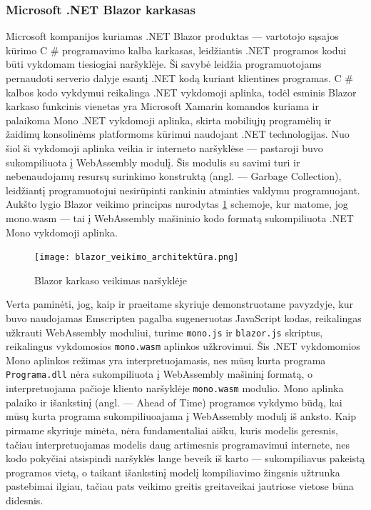 \documentclass{VUMIFPSkursinis}
\begin{document}
\subsubsection{Microsoft .NET Blazor karkasas}
Microsoft kompanijos kuriamas .NET Blazor produktas — vartotojo sąsajos kūrimo C \# programavimo kalba karkasas, leidžiantis .NET programos kodui būti vykdomam tiesiogiai naršyklėje. \cite{BLZ19} Ši savybė leidžia programuotojams pernaudoti serverio dalyje esantį .NET kodą kuriant klientines programas.
C \# kalbos kodo vykdymui reikalinga .NET vykdomoji aplinka, todėl esminis Blazor karkaso funkcinis vienetas yra Microsoft Xamarin komandos kuriama ir palaikoma Mono .NET vykdomoji aplinka, skirta mobiliųjų programėlių ir žaidimų konsolinėms platformoms kūrimui naudojant .NET technologijas. Nuo šiol ši vykdomoji aplinka veikia ir interneto naršyklėse — pastaroji buvo sukompiliuota į WebAssembly modulį. Šis modulis su savimi turi ir nebenaudojamų resursų surinkimo konstruktą (angl. — Garbage Collection), leidžiantį programuotojui nesirūpinti rankiniu atminties valdymu programuojant. Aukšto lygio Blazor veikimo principas nurodytas \ref{fig:blazor_architecture} schemoje, kur matome, jog mono.wasm — tai į WebAssembly mašininio kodo formatą sukompiliuota .NET Mono vykdomoji aplinka.

\begin{figure}[h!]
  \begin{center}
  \texttt{[image: blazor\_veikimo\_architektūra.png]}
  \end{center}
  \caption{Blazor karkaso veikimas naršyklėje \cite{BLZ19}}
  \label{fig:blazor_architecture}
\end{figure}

Verta paminėti, jog, kaip ir praeitame skyriuje demonstruotame pavyzdyje, kur buvo naudojamas Emscripten pagalba sugeneruotas JavaScript kodas, reikalingas užkrauti WebAssembly moduliui, turime \verb|mono.js| ir \verb|blazor.js| skriptus, reikalingus vykdomosios \verb|mono.wasm| aplinkos užkrovimui. Šis .NET vykdomomios Mono aplinkos režimas yra interpretuojamasis, nes mūsų kurta programa \verb|Programa.dll| nėra sukompiliuota į WebAssembly mašininį formatą, o interpretuojama pačioje kliento naršyklėje \verb|mono.wasm| modulio. Mono aplinka palaiko ir išankstinį (angl. — Ahead of Time) programos vykdymo būdą, kai mūsų kurta programa sukompiliuoajama į WebAssembly modulį iš anksto. Kaip pirmame skyriuje minėta, nėra fundamentaliai aišku, kuris modelis geresnis, tačiau interpretuojamas modelis daug artimesnis programavimui internete, nes kodo pokyčiai atsispindi naršyklės lange beveik iš karto — sukompiliavus pakeistą programos vietą, o taikant išankstinį modelį kompiliavimo žingsnis užtrunka pastebimai ilgiau, tačiau pats veikimo greitis greitaveikai jautriose vietose būna didesnis.
\end{document}
